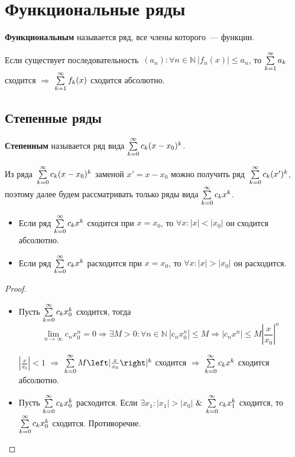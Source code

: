 \section{Функциональные ряды}
 \textbf{Функциональным} называется ряд, все члены которого~--- функции.

\begin{theorem}
Если существует последовательность~$(a_n) \colon \forall n \in \mathbb N \ \allowbreak |f_n(x)| \leqslant a_n$, то $\series a_k$ сходится $\Rightarrow$ $\series f_k(x)$ сходится абсолютно.
\end{theorem}

\subsection{Степенные ряды}
 \textbf{Степенным} называется ряд вида $\series[0] c_k (x - x_0)^k$.

Из ряда~$\series[0] c_k (x - x_0)^k$ заменой $x' = x - x_0$ можно получить ряд~$\series[0] c_k (x')^k$, поэтому далее будем рассматривать только ряды вида $\series[0] c_k x^k$.

\begin{theorem}[Абеля]
\begin{itemize}
	\item Если ряд $\series[0] c_k x^k$ сходится при $x = x_0$, то $\forall x \colon |x| < |x_0|$ он сходится абсолютно.
	\item Если ряд $\series[0] c_k x^k$ расходится при $x = x_0$, то $\forall x \colon |x| > |x_0|$ он расходится.
\end{itemize}
\end{theorem}
\begin{proof}
\begin{itemize}
	\item Пусть $\series[0] c_k x_0^k$ сходится, тогда
	\begin{equation*}
	\lim_{n \to \infty} c_n x_0^n = 0 \Rightarrow
	\exists M > 0 \colon \forall n \in \mathbb N \ |c_n x_0^n| \leqslant M \Rightarrow
	|c_n x^n| \leqslant M \left| \frac{x}{x_0} \right|^n
	\end{equation*}
	
	$\left| \frac{x}{x_0} \right| < 1$ $\Rightarrow$ $\series[0] M \left| \frac{x}{x_0} \right|^k$ сходится $\Rightarrow$ $\series[0] c_k x^k$ сходится абсолютно.
	
	\item Пусть $\series[0] c_k x_0^k$ расходится.
	Если $\exists x_1 \colon |x_1| > |x_0|$ $\mathrel{\&}$ $\series[0] c_k x_1^k$ сходится, то $\series[0] c_k x_0^k$ сходится.
	Противоречие.
\end{itemize}
\end{proof}

